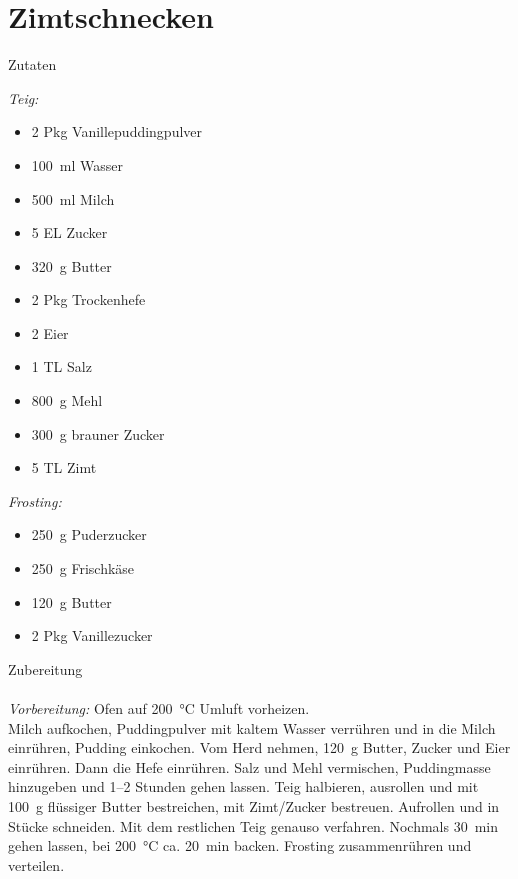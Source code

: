 \section*{Zimtschnecken}
\ihead{}\ohead{}
\cfoot{}
{\Large Zutaten}
\begin{multicols}{2}
\textit{Teig:}
\begin{itemize}
    \item \num{2} Pkg Vanillepuddingpulver
    \item \SI{100}{ml} Wasser
    \item \SI{500}{ml} Milch
    \item \num{5} EL Zucker
    \item \SI{320}{g} Butter
    \item \num{2} Pkg Trockenhefe
    \item \num{2} Eier
    \item \num{1} TL Salz
    \item \SI{800}{g} Mehl
    \item \SI{300}{g} brauner Zucker
    \item \num{5} TL Zimt
\end{itemize}
\textit{Frosting:}
\begin{itemize}
    \item \SI{250}{g} Puderzucker
    \item \SI{250}{g} Frischkäse
    \item \SI{120}{g} Butter
    \item \num{2} Pkg Vanillezucker
\end{itemize}
\end{multicols}
\noindent
{\Large Zubereitung}\\
\\
\textit{Vorbereitung:} Ofen auf \SI{200}{\celsius} Umluft vorheizen.\\
Milch aufkochen, Puddingpulver mit kaltem Wasser verrühren und in die Milch einrühren, Pudding einkochen.
Vom Herd nehmen, \SI{120}{g} Butter, Zucker und Eier einrühren.
Dann die Hefe einrühren. 
Salz und Mehl vermischen, Puddingmasse hinzugeben und \numrange{1}{2} Stunden gehen lassen.
Teig halbieren, ausrollen und mit \SI{100}{g} flüssiger Butter bestreichen, mit Zimt/Zucker bestreuen. 
Aufrollen und in Stücke schneiden.
Mit dem restlichen Teig genauso verfahren. 
Nochmals \SI{30}{min} gehen lassen, bei \SI{200}{\celsius} ca. \SI{20}{min} backen.
Frosting zusammenrühren und verteilen. 
